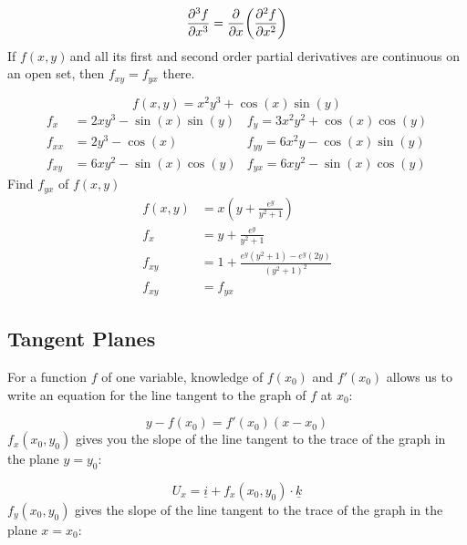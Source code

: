 \documentclass{article}
\newcommand{\n}{\leavevmode \newline} %
\newcommand{\nn}{\leavevmode \newline \newline} %
\newcommand{\fxy}{$f(x,y)\,$} %
\numberwithin{equation}{subsection} %
\begin{document}
\begin{equation}
    \pdv[3]{f}{x}=\pdv{x}(\pdv[2]{f}{x})
\end{equation}
\nn
If \fxy and all its first and second order partial derivatives are continuous on an open set, then $f_{xy}=f_{yx}$ there.

\begin{equation}
        f(x,y)=x^2y^3+\cos(x)\sin(y)
\end{equation}
\begin{align*}
    f_x&=2xy^3-\sin(x)\sin(y) &f_y=3x^2y^2+\cos(x)\cos(y)\\
    f_{xx}&=2y^3-\cos(x) &f_{yy}=6x^2y-\cos(x)\sin(y)\\
    f_{xy}&=6xy^2-\sin(x)\cos(y) &f_{yx}=6xy^2-\sin(x)\cos(y)
\end{align*}
\n
Find $f_{yx}$ of \fxy
\begin{equation}
    \begin{split}
        f(x,y)&=x\left(y+\frac{e^y}{y^2+1}\right)\\
        f_x&=y+\frac{e^y}{y^2+1}\\
        f_{xy}&=1+\frac{e^y(y^2+1)-e^y(2y)}{(y^2+1)^2}\\
        f_{xy}&=f_{yx}
    \end{split}
\end{equation}
\subsection{Tangent Planes}
For a function $f$ of one variable, knowledge of $f(x_0)$ and $f'(x_0)$ allows us to write an equation for the line tangent to the graph of $f$ at $x_0$:

\begin{equation}
    y-f(x_0)=f'(x_0)(x-x_0)
\end{equation}
\n
$f_x(x_0,y_0)$ gives you the slope of the line tangent to the trace of the graph in the plane $y=y_0$:

\begin{equation}
        U_x=\underline{i} + f_x(x_0,y_0)\cdot \underline{k}
\end{equation}
\n
$f_y(x_0,y_0)$ gives the slope of the line tangent to the trace of the graph in the plane $x=x_0$:
\end{document}
